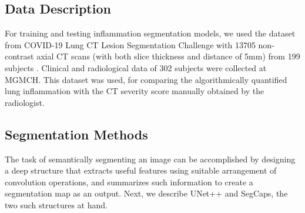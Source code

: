 \subsection{{Data Description}}
\label{sec:Data Description}

For training and testing inflammation segmentation models, we used the dataset from COVID-19 Lung CT Lesion Segmentation Challenge with 13705 non-contrast axial CT scans (with both slice thickness and distance of 5mm) from 199 subjects \cite{roth2021rapid}.
Clinical and radiological data of 302 subjects were collected at MGMCH. This dataset was used, for comparing the algorithmically quantified lung inflammation with the CT severity score manually obtained by the radiologist.



\subsection{Segmentation Methods}
\label{sec:Segmentation Methods}

The task of semantically segmenting an image can be accomplished by designing a deep structure that extracts useful features using suitable arrangement of convolution operations, and summarizes such information to create a segmentation map as an output. Next, we describe UNet++ and SegCaps, the two such structures at hand.

